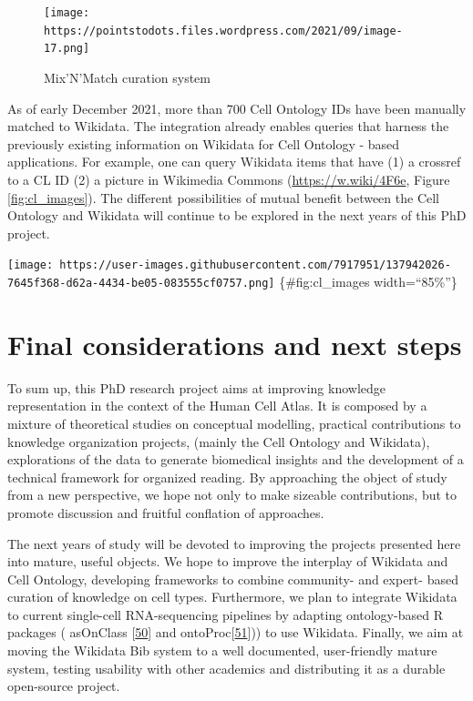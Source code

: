 \begin{figure}
\hypertarget{fig:mixnmatch_cl}{%
\centering
\texttt{[image: https://pointstodots.files.wordpress.com/2021/09/image-17.png]}
\caption{Mix'N'Match curation system}\label{fig:mixnmatch_cl}
}
\end{figure}

As of early December 2021, more than 700 Cell Ontology IDs have been manually matched to Wikidata.
The integration already enables queries that harness the previously existing information on Wikidata for Cell Ontology - based applications.
For example, one can query Wikidata items that have (1) a crossref to a CL ID (2) a picture in Wikimedia Commons (\url{https://w.wiki/4F6e}, Figure \ref{fig:cl_images}).
The different possibilities of mutual benefit between the Cell Ontology and Wikidata will continue to be explored in the next years of this PhD project.

\texttt{[image: https://user-images.githubusercontent.com/7917951/137942026-7645f368-d62a-4434-be05-083555cf0757.png]} \{\#fig:cl\_images width=``85\%''\}

\hypertarget{final-considerations-and-next-steps}{%
\section{Final considerations and next steps}\label{final-considerations-and-next-steps}}

To sum up, this PhD research project aims at improving knowledge representation in the context of the Human Cell Atlas.
It is composed by a mixture of theoretical studies on conceptual modelling, practical contributions to knowledge organization projects, (mainly the Cell Ontology and Wikidata), explorations of the data to generate biomedical insights and the development of a technical framework for organized reading.
By approaching the object of study from a new perspective, we hope not only to make sizeable contributions, but to promote discussion and fruitful conflation of approaches.

The next years of study will be devoted to improving the projects presented here into mature, useful objects.
We hope to improve the interplay of Wikidata and Cell Ontology, developing frameworks to combine community- and expert- based curation of knowledge on cell types.
Furthermore, we plan to integrate Wikidata to current single-cell RNA-sequencing pipelines by adapting ontology-based R packages ( asOnClass {[}\protect\hyperlink{ref-sW6aNZJB}{50}{]} and ontoProc{[}\protect\hyperlink{ref-15YmDXALp}{51}{]})) to use Wikidata.
Finally, we aim at moving the Wikidata Bib system to a well documented, user-friendly mature system, testing usability with other academics and distributing it as a durable open-source project.

